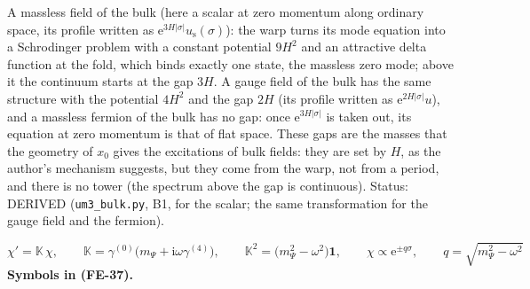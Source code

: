 \documentclass[
  10pt,
]{article}
\begin{document}
A massless field of the bulk (here a scalar at zero momentum along
ordinary space, its profile written as
\(\mathrm{e}^{3H\lvert\sigma\rvert}u_{\mathrm{s}}(\sigma)\)): the warp
turns its mode equation into a Schrodinger problem with a constant
potential \(9H^2\) and an attractive delta function at the fold, which
binds exactly one state, the massless zero mode; above it the continuum
starts at the gap \(3H\). A gauge field of the bulk has the same
structure with the potential \(4H^2\) and the gap \(2H\) (its profile
written as \(\mathrm{e}^{2H\lvert\sigma\rvert}u\)), and a massless
fermion of the bulk has no gap: once
\(\mathrm{e}^{3H\lvert\sigma\rvert}\) is taken out, its equation at zero
momentum is that of flat space. These gaps are the masses that the
geometry of \(x_0\) gives the excitations of bulk fields: they are set
by \(H\), as the author's mechanism suggests, but they come from the
warp, not from a period, and there is no tower (the spectrum above the
gap is continuous). Status: DERIVED (\texttt{um3\_bulk.py}, B1, for the
scalar; the same transformation for the gauge field and the fermion).

\[
\chi' = \mathbb{K}\,\chi,\qquad \mathbb{K} = \gamma^{(0)}\big(m_\Psi + \mathrm{i}\omega\gamma^{(4)}\big),\qquad
\mathbb{K}^2 = \big(m_\Psi^2 - \omega^2\big)\mathbf{1},\qquad \chi \propto \mathrm{e}^{\pm q\sigma},\qquad q = \sqrt{m_\Psi^2 - \omega^2} \tag{FE-37}
\] \textbf{Symbols in (FE-37).}
\end{document}
